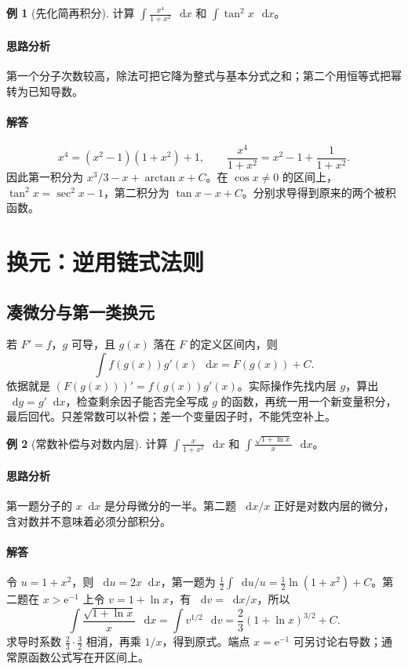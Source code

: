 \documentclass[UTF8,fontset=fandol,12pt,oneside,openany]{ctexrep}
\newcommand{\dd}{\mathop{}\!\mathrm d}
\newcommand{\ee}{\mathrm e}
\theoremstyle{definition}
\newtheorem{example}{例}[chapter]
\begin{document}
\begin{example}[先化简再积分]
计算 $\displaystyle\int\frac{x^4}{1+x^2}\,\dd x$ 和 $\displaystyle\int\tan^2x\,\dd x$。
\end{example}
\paragraph{思路分析}第一个分子次数较高，除法可把它降为整式与基本分式之和；第二个用恒等式把幂转为已知导数。
\paragraph{解答}
\[
x^4=(x^2-1)(1+x^2)+1,
\qquad \frac{x^4}{1+x^2}=x^2-1+\frac1{1+x^2}.
\]
因此第一积分为 $x^3/3-x+\arctan x+C$。在 $\cos x\ne0$ 的区间上，$\tan^2x=\sec^2x-1$，第二积分为 $\tan x-x+C$。分别求导得到原来的两个被积函数。

\section{换元：逆用链式法则}
\label{lec:10:substitution}
\subsection{凑微分与第一类换元}
若 $F'=f$，$g$ 可导，且 $g(x)$ 落在 $F$ 的定义区间内，则
\[
\int f(g(x))g'(x)\,\dd x=F(g(x))+C.
\]
依据就是 $(F(g(x)))'=f(g(x))g'(x)$。实际操作先找内层 $g$，算出 $\dd g=g'\dd x$，检查剩余因子能否完全写成 $g$ 的函数，再统一用一个新变量积分，最后回代。只差常数可以补偿；差一个变量因子时，不能凭空补上。

\begin{example}[常数补偿与对数内层]
计算 $\displaystyle\int\frac{x}{1+x^2}\,\dd x$ 和 $\displaystyle\int\frac{\sqrt{1+\ln x}}x\,\dd x$。
\end{example}
\paragraph{思路分析}第一题分子的 $x\dd x$ 是分母微分的一半。第二题 $\dd x/x$ 正好是对数内层的微分，含对数并不意味着必须分部积分。
\paragraph{解答}令 $u=1+x^2$，则 $\dd u=2x\dd x$，第一题为 $\frac12\int\dd u/u=\frac12\ln(1+x^2)+C$。第二题在 $x>\ee^{-1}$ 上令 $v=1+\ln x$，有 $\dd v=\dd x/x$，所以
\[
\int\frac{\sqrt{1+\ln x}}x\,\dd x
=\int v^{1/2}\,\dd v=\frac23(1+\ln x)^{3/2}+C.
\]
求导时系数 $\frac23\cdot\frac32$ 相消，再乘 $1/x$，得到原式。端点 $x=\ee^{-1}$ 可另讨论右导数；通常原函数公式写在开区间上。
\end{document}
